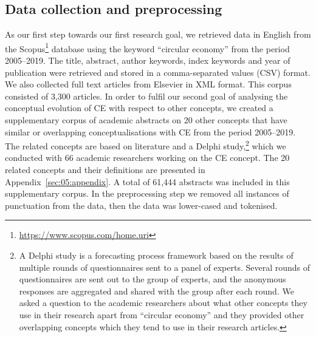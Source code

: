 \documentclass[output=paper]{langsci/langscibook}
\begin{document}
\subsection{Data collection and preprocessing}
As our first step towards our first research goal, we retrieved data in English from the Scopus\footnote{\url{https://www.scopus.com/home.uri}} database using the keyword ``circular economy'' from the period 2005--2019. The title, abstract, author keywords, index keywords and year of publication were retrieved and stored in a comma-separated values (CSV) format. We also collected full text articles from Elsevier in XML format. This corpus consisted of 3,300 articles. 
In order to fulfil our second goal of analysing the conceptual evolution of CE with respect to other concepts, we created a supplementary corpus of academic abstracts on 20 other concepts that have similar or overlapping conceptualisations with CE from the period 2005--2019. The related concepts are based on literature \citep{d2017green, geisendorf2018circular} and a Delphi study,\footnote{A Delphi study is a forecasting process framework based on the results of multiple rounds of questionnaires sent to a panel of experts. Several rounds of questionnaires are sent out to the group of experts, and the anonymous responses are aggregated and shared with the group after each round. We asked a question to the academic researchers about what other concepts they use in their research apart from ``circular economy'' and they provided other overlapping concepts which they tend to use in their research articles.} which we conducted with 66 academic researchers working on the CE concept. The 20 related concepts and their definitions are presented in Appendix~\ref{sec:05:appendix}. A total of 61,444 abstracts was included  in this supplementary corpus. In the preprocessing step we removed all instances of punctuation from the data, then the data was lower-cased and tokenised.
\end{document}
